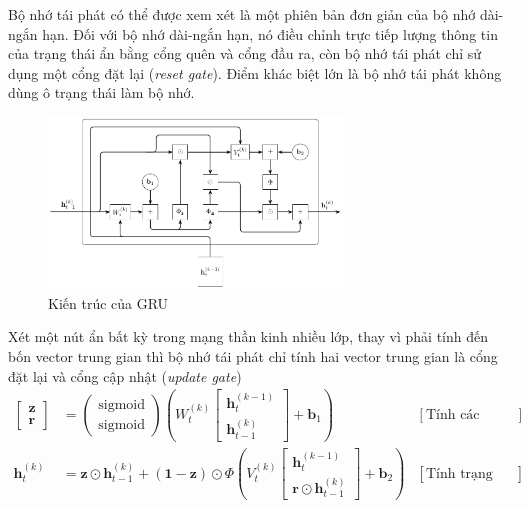 Bộ nhớ tái phát có thể được xem xét là một phiên bản đơn giản của bộ nhớ dài-ngắn hạn. Đối với bộ nhớ dài-ngắn hạn, nó điều chỉnh trực tiếp lượng thông tin của trạng thái ẩn bằng cổng quên và cổng đầu ra, còn bộ nhớ tái phát chỉ sử dụng một cổng đặt lại (\textit{reset gate}). Điểm khác biệt lớn là bộ nhớ tái phát không dùng ô trạng thái làm bộ nhớ.
\begin{figure}[htb]
    \centering
    \includegraphics[width=0.7\textwidth]{tikz_image/gru_architecture.pdf}
    \caption{Kiến trúc của GRU}
    \label{fig:gru-architecture}
\end{figure}

Xét một nút ẩn bất kỳ trong mạng thần kinh nhiều lớp, thay vì phải tính đến bốn vector trung gian thì bộ nhớ tái phát chỉ tính hai vector trung gian là cổng đặt lại và cổng cập nhật (\textit{update gate})
\begin{align}
    \begin{bmatrix}
        \mathbf z \\
        \mathbf r
    \end{bmatrix}
     & =
    \begin{pmatrix}
        \text{sigmoid} \\
        \text{sigmoid}
    \end{pmatrix}
    \left(W^{(k)}_t
    \begin{bmatrix}
            \mathbf h_{t}^{(k-1)} \\
            \mathbf h_{t-1}^{(k)}
        \end{bmatrix}
    +\mathbf b_1\right)
     & [\text{Tính các vector trung gian}]                                 \\
    \mathbf h_t^{(k)}
     & =\mathbf z\odot\mathbf h_{t-1}^{(k)}+(\mathbf 1-\mathbf z)\odot\Phi
    \left(V^{(k)}_t
    \begin{bmatrix}
            \mathbf h_{t}^{(k-1)} \\
            \mathbf r\odot\mathbf h_{t-1}^{(k)}
        \end{bmatrix}
    +\mathbf b_2\right)
     & [\text{Tính trạng thái ẩn}]
\end{align}

